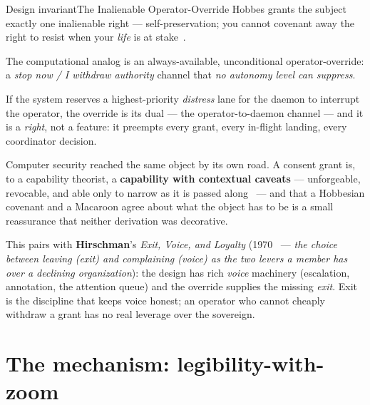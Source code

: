 \documentclass[11pt,a4paper]{article}
\theoremstyle{definition}
\theoremstyle{plain}
\begin{document}
\begin{pdclaim}{Design invariant}{The Inalienable Operator-Override}
\setlength{\parskip}{4pt plus 1pt}
\label{prop:override}
Hobbes grants the subject exactly one inalienable right --- self-preservation; you
cannot covenant away the right to resist when your \emph{life} is at
stake~.

The computational analog is an always-available,
unconditional operator-override: a \emph{stop now / I withdraw authority} channel
that \emph{no autonomy level can suppress}.

If the system reserves a highest-priority
\emph{distress} lane for the daemon to interrupt the operator, the override is its
dual --- the operator-to-daemon channel --- and it is a \emph{right}, not a feature:
it preempts every grant, every in-flight landing, every coordinator decision.
\end{pdclaim}

\ifpdmargincolumn\pdconsentregion\fi
Computer security reached the same object by its own road. A consent grant is,
to a capability theorist, a \textbf{capability with contextual caveats} ---
unforgeable, revocable, and able only to narrow as it is passed
along~ --- and that a Hobbesian covenant and a Macaroon
agree about what the object has to be is a small reassurance that neither
derivation was decorative.

This pairs with \textbf{Hirschman}'s \emph{Exit, Voice, and Loyalty}
(1970~ --- \emph{the choice between leaving (exit) and
complaining (voice) as the two levers a member has over a declining organization}):
the design has rich \emph{voice} machinery (escalation, annotation, the attention
queue) and the override supplies the missing \emph{exit}. Exit is the discipline that keeps
voice honest; an operator who cannot cheaply withdraw a grant has no real leverage
over the sovereign.

\pdexercisepointer{\ref{ex:ls-express-vs-tacit-consent}}{\ref{ex:ls-ranker-counter-surface}}{\pageref{ex:ls-express-vs-tacit-consent}}

\section{The mechanism: legibility-with-zoom}\label{sec:zoom}
\end{document}

